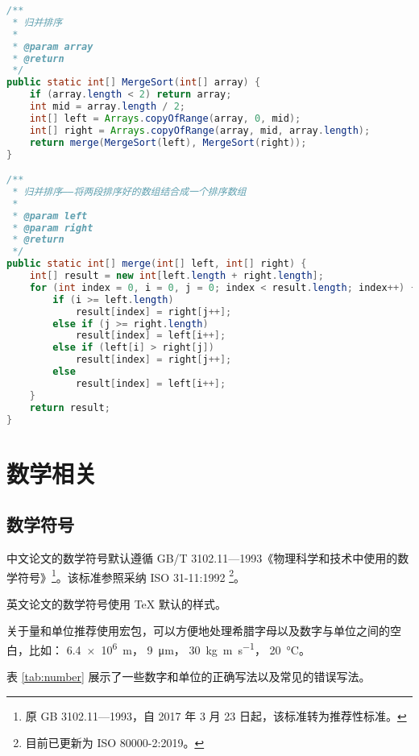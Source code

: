 \documentclass[report, twoside, UTF8, AutoFakeBold = 1, AutoFakeSlant, zihao = -4]{config}
\begin{document}
\begin{lstlisting}[label=code:Java, language=Java, caption=Java代码测试]
/**
 * 归并排序
 *
 * @param array
 * @return
 */
public static int[] MergeSort(int[] array) {
    if (array.length < 2) return array;
    int mid = array.length / 2;
    int[] left = Arrays.copyOfRange(array, 0, mid);
    int[] right = Arrays.copyOfRange(array, mid, array.length);
    return merge(MergeSort(left), MergeSort(right));
}

/**
 * 归并排序——将两段排序好的数组结合成一个排序数组
 *
 * @param left
 * @param right
 * @return
 */
public static int[] merge(int[] left, int[] right) {
    int[] result = new int[left.length + right.length];
    for (int index = 0, i = 0, j = 0; index < result.length; index++) {
        if (i >= left.length)
            result[index] = right[j++];
        else if (j >= right.length)
            result[index] = left[i++];
        else if (left[i] > right[j])
            result[index] = right[j++];
        else
            result[index] = left[i++];
    }
    return result;
}
\end{lstlisting}

\chapter{数学相关}

\section{数学符号}

中文论文的数学符号默认遵循 GB/T 3102.11—1993《物理科学和技术中使用的数学符号》\footnote{原 GB 3102.11—1993，自 2017 年 3 月 23 日起，该标准转为推荐性标准。}。该标准参照采纳 ISO 31-11:1992 \footnote{目前已更新为 ISO 80000-2:2019。}。

英文论文的数学符号使用 \TeX{} 默认的样式。

关于量和单位推荐使用\href{http://mirrors.ctan.org/macros/latex/contrib/siunitx/siunitx.pdf}{}宏包，可以方便地处理希腊字母以及数字与单位之间的空白，比如：
\SI{6.4e6}{m}，
\SI{9}{\micro\meter}，
\SI{30}{kg.m.s^{-1}}，
\SI{20}{\degreeCelsius}。

表 \ref{tab:number} 展示了一些数字和单位的正确写法以及常见的错误写法。
\end{document}
